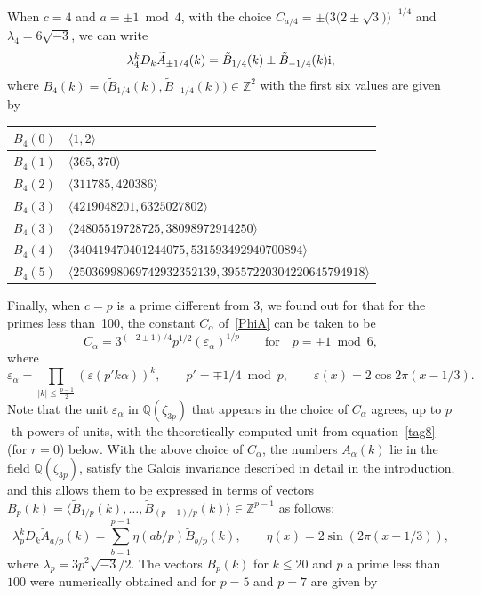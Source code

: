 \documentclass[pdftex]{sigma}
\numberwithin{equation}{section}
\def\BZ{\mathbb Z}
\def\BQ{\mathbb Q}
\def\la{\langle}
\def\ra{\rangle}
\def\wt{\widetilde}
\def\z{\zeta}
\def\a{\alpha}
\def\a{\alpha}
\def\z{\zeta}
\def\ve{\varepsilon}
\def\tiA{\wt A}
\def\tiB{\tilde{B}}
\begin{document}
When $c=4$ and $a= \pm 1 \bmod 4$, with the choice
$C_{a/4}=\pm \big(3 \big(2 \pm \sqrt{3}\big)\big)^{-1/4}$ and $\lambda_4=6\sqrt{-3}$,
we can write
\[
\lambda_4^k  D_k  \tiA_{\pm 1/4}(k) = \tiB_{1/4}(k) \pm \tiB_{-1/4}(k){\rm i},
\]
where $B_4(k)=\big(\tiB_{1/4}(k),\tiB_{-1/4}(k)\big) \in \BZ^2$ with the first
six values are given by

\begin{center}\renewcommand{\arraystretch}{1.2}
\begin{tabular}{|c|l|}
\hline
$B_4(0)$ & $\la 1, 2 \ra$ \\
\hline
$B_4(1)$ & $\la 365, 370 \ra$ \\
\hline
$B_4(2)$ & $\la 311785, 420386 \ra$ \\
\hline
$B_4(3)$ & $\la 4219048201, 6325027802 \ra$ \\
\hline
$B_4(3)$ & $\la 24805519728725, 38098972914250 \ra$ \\
\hline
$B_4(4)$ & $\la 340419470401244075, 531593492940700894 \ra$ \\
\hline
$B_4(5)$ & $\la 25036998069742932352139, 39557220304220645794918 \ra$ \\
\hline
\end{tabular}
\end{center}


Finally, when $c=p$ is a prime different from $3$, we found
out for that for the primes less than~100, the
constant $C_\a$ of~\eqref{PhiA} can be taken to be
\[
C_{\a} = 3^{(-2 \pm 1)/4}  p^{1/2} (\ve_\a)^{1/p}
\qquad \text{for} \quad p=\pm 1 \bmod 6,
\]
where
\[
\ve_\a = \prod_{|k| \leq \frac{p-1}{2}} (\ve(p'k\a))^k, \qquad
p'=\mp 1/4 \bmod p,
\qquad \ve(x)=2 \cos 2 \pi(x-1/3) .
\]
Note that the unit $\ve_\a$ in $\BQ(\z_{3p})$
that appears in the choice of $C_\a$ agrees, up to $p$-th powers of units,
with the theoretically computed unit from equation~\eqref{tag8} (for $r=0$)
below. With the above choice of $C_\a$, the numbers $A_{\a}(k)$ lie in the
field $\BQ(\z_{3p})$, satisfy the Galois invariance described in detail
in the introduction, and this allows them to be expressed in terms of vectors~${B_p(k)=\big\la \tiB_{1/p}(k),\dots,\tiB_{(p-1)/p}(k) \big\ra \in \BZ^{p-1}}$
as follows:
\[
\lambda_p^k  D_k  \tiA_{a/p}(k) = \sum_{b=1}^{p-1} \eta(ab/p) \tiB_{b/p}(k),
\qquad \eta(x) = 2 \sin(2 \pi (x-1/3)) ,
\]
where $\lambda_p = 3p^2 \sqrt{-3}/2$. The vectors $B_p(k)$ for $k \leq 20$ and
$p$ a prime less than $100$ were numerically obtained and for $p=5$ and
$p=7$ are given by
\end{document}
